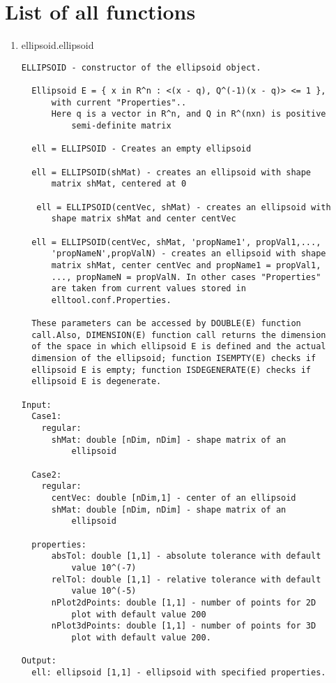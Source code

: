 \section{List of all functions}
\begin{enumerate}
\item {ellipsoid.ellipsoid}
\selectfont
\begin{lstlisting}
ELLIPSOID - constructor of the ellipsoid object.

  Ellipsoid E = { x in R^n : <(x - q), Q^(-1)(x - q)> <= 1 },
      with current "Properties"..
      Here q is a vector in R^n, and Q in R^(nxn) is positive
          semi-definite matrix

  ell = ELLIPSOID - Creates an empty ellipsoid

  ell = ELLIPSOID(shMat) - creates an ellipsoid with shape
      matrix shMat, centered at 0

   ell = ELLIPSOID(centVec, shMat) - creates an ellipsoid with
      shape matrix shMat and center centVec

  ell = ELLIPSOID(centVec, shMat, 'propName1', propVal1,...,
      'propNameN',propValN) - creates an ellipsoid with shape
      matrix shMat, center centVec and propName1 = propVal1,
      ..., propNameN = propValN. In other cases "Properties"
      are taken from current values stored in
      elltool.conf.Properties.

  These parameters can be accessed by DOUBLE(E) function
  call.Also, DIMENSION(E) function call returns the dimension
  of the space in which ellipsoid E is defined and the actual
  dimension of the ellipsoid; function ISEMPTY(E) checks if
  ellipsoid E is empty; function ISDEGENERATE(E) checks if
  ellipsoid E is degenerate.

Input:
  Case1:
    regular:
      shMat: double [nDim, nDim] - shape matrix of an
          ellipsoid

  Case2:
    regular:
      centVec: double [nDim,1] - center of an ellipsoid
      shMat: double [nDim, nDim] - shape matrix of an
          ellipsoid

  properties:
      absTol: double [1,1] - absolute tolerance with default
          value 10^(-7)
      relTol: double [1,1] - relative tolerance with default
          value 10^(-5)
      nPlot2dPoints: double [1,1] - number of points for 2D
          plot with default value 200
      nPlot3dPoints: double [1,1] - number of points for 3D
          plot with default value 200.

Output:
  ell: ellipsoid [1,1] - ellipsoid with specified properties.


\end{lstlisting}
\end{enumerate}
